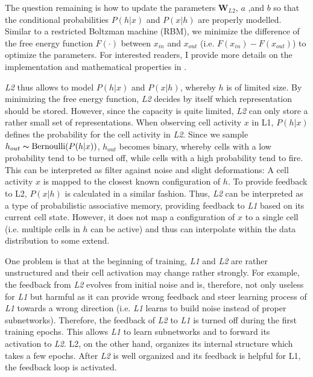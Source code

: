 The question remaining is how to update the parameters $\boldsymbol{W}_{L2}$, $a$ ,and $b$ so that the conditional probabilities $P(h|x)$ and $P(x|h)$ are properly modelled.
Similar to a restricted Boltzman machine (RBM), we minimize the difference of the free energy function $F(\cdot)$ between $x_{in}$ and $x_{out}$ (i.e. $F(x_{in}) - F(x_{out})$) to optimize the parameters. For interested readers, I provide more details on the implementation and mathematical properties in .

\emph{L2} thus allows to model $P(h|x)$ and $P(x|h)$, whereby $h$ is of limited size.
By minimizing the free energy function, \emph{L2} decides by itself which representation should be stored.
However, since the capacity is quite limited, \emph{L2} can only store a rather small set of representations.
When observing cell activity $x$ in L1, $P(h|x)$ defines the probability for the cell activity in \emph{L2}. Since we sample $h_{out} \thicksim \text{Bernoulli}(P(h | x) )$, $h_{out}$ becomes binary, whereby cells with a low probability tend to be turned off, while cells with a high probability tend to fire.
This can be interpreted as filter against noise and slight deformations: A cell activity $x$ is mapped to the closest known configuration of $h$.
To provide feedback to L2, $P(x|h)$ is calculated in a similar fashion. Thus, \emph{L2} can be interpreted as a type of probabilistic associative memory, providing feedback to \emph{L1} based on its current cell state.
However, it does not map a configuration of $x$ to a single cell (i.e. multiple cells in $h$ can be active) and thus can interpolate within the data distribution to some extend.

One problem is that at the beginning of training, \emph{L1} and \emph{L2} are rather unstructured and their cell activation may change rather strongly.
For example, the feedback from \emph{L2} evolves from initial noise and is, therefore, not only useless for \emph{L1} but harmful as it can provide wrong feedback and steer learning process of \emph{L1} towards a wrong direction (i.e. \emph{L1} learns to build noise instead of proper subnetworks).
Therefore, the feedback of \emph{L2} to \emph{L1} is turned off during the first training epochs.
This allows \emph{L1} to learn subnetworks and to forward its activation to \emph{L2}. L2, on the other hand, organizes its internal structure which takes a few epochs.
After \emph{L2} is well organized and its feedback is helpful for L1, the feedback loop is activated.



